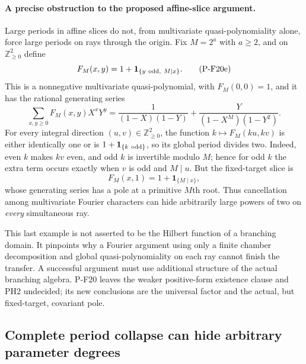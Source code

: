 \documentclass[11pt,a4paper]{article}
\begin{document}
\paragraph{A precise obstruction to the proposed affine-slice argument.}
Large periods in affine slices do not, from multivariate
quasi-polynomiality alone, force large periods on rays through the
origin. Fix $M=2^a$ with $a\ge2$, and on
$\mathbb Z_{\ge0}^2$ define
\[
 F_M(x,y)=1+\mathbf1_{\{y\ {\rm odd},\ M\mid x\}}.
 \tag{P-F20e}
\]
This is a nonnegative multivariate quasi-polynomial, with
$F_M(0,0)=1$, and it has the rational generating series
\[
 \sum_{x,y\ge0}F_M(x,y)X^xY^y
  =\frac1{(1-X)(1-Y)}+
       \frac{Y}{(1-X^M)(1-Y^2)}.
\]
For every integral direction $(u,v)\in\mathbb Z_{\ge0}^2$,
the function $k\mapsto F_M(ku,kv)$ is either identically one
or is $1+\mathbf1_{\{k\ {\rm odd}\}}$, so its global period
divides two. Indeed, even $k$ makes $kv$ even, and odd $k$ is
invertible modulo $M$; hence for odd $k$ the extra term occurs
exactly when $v$ is odd and $M\mid u$.
But the fixed-target slice is
\[
 F_M(x,1)=1+\mathbf1_{\{M\mid x\}},
\]
whose generating series has a pole at a primitive $M$th root.
Thus cancellation among multivariate Fourier characters can hide
arbitrarily large powers of two on \emph{every} simultaneous ray.

This last example is not asserted to be the Hilbert function of
a branching domain. It pinpoints why a Fourier argument using
only a finite chamber decomposition and global
quasi-polynomiality on each ray cannot finish the transfer.
A successful argument must use additional structure of the actual
branching algebra. P-F20 leaves the weaker positive-form existence
clause and PH2 undecided; its new conclusions are the universal
factor and the actual, but fixed-target, covariant pole.


\subsection{Complete period collapse can hide arbitrary parameter degrees}
\end{document}
